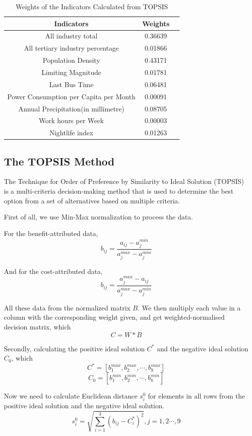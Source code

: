 \begin{table}[H] \centering
    \caption{Weights of the Indicators Calculated from TOPSIS}
    \begin{tabular}{ccl}
        \toprule
        Indicators & Weights\\ \hline
        All industry total & 0.36639\\
        All tertiary industry percentage & 0.01866\\
        Population Density & 0.43171\\
        Limiting Magnitude & 0.01781\\
        Last Bus Time & 0.06481\\
        Power Consumption per Capita per Month & 0.00091\\
        Annual Precipitation(in millimetre) & 0.08705\\
        Work hours per Week & 0.00003\\
        Nightlife index & 0.01263\\
        \bottomrule
    \end{tabular}
\end{table}


\subsection{The TOPSIS Method}

The Technique for Order of Preference by Similarity to Ideal Solution (TOPSIS) is a multi-criteria decision-making method that is used to determine the best option from a set of alternatives based on multiple criteria. 

First of all, we use Min-Max normalization to process the data.

For the benefit-attributed data,
$$b_{ij}=\frac{a_{ij}-a_j^{min}}{a_j^{max}-a_j^{min}}$$

And for the cost-attributed data,
$$b_{ij}=\frac{a_{j}^{max}-a_{ij}}{a_j^{max}-a_j^{min}}$$

All these data from the normalized matrix $B$. We then multiply each value in a column with the corresponding weight given, and get weighted-normalised decision matrix, which $$C=W*B$$

Secondly, calculating the positive ideal solution $C^*$ and the negative ideal solution $C_0$, which$$C^*=[b_1^{max},b_2^{max},\cdots,b_8^{max}]$$ $$C_0=[b_1^{min},b_2^{min},\cdots,b_8^{min}]$$

Now we need to calculate Euclidean distance $s_i^{0}$ for elements in all rows from the positive ideal solution and the negative ideal solution.$$s_i^{0}=\sqrt{\sum_{i=1}^{3}(b_{ij}-C_i^{*})^{2}},j=1,2\cdots,9$$

